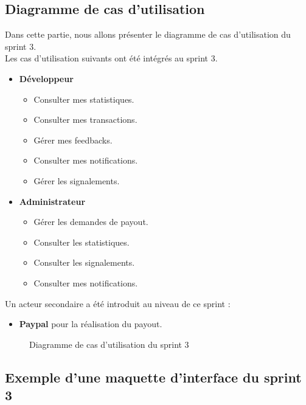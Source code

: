 \subsection{Diagramme de cas d'utilisation}
Dans cette partie, nous allons présenter le diagramme de cas d'utilisation du sprint 3. \\
Les cas d'utilisation suivants ont été intégrés au sprint 3.

\begin{itemize}
    \item  \textbf{Développeur}
    \begin{itemize}
        \item  Consulter mes statistiques.
        \item Consulter mes transactions.
        \item Gérer mes feedbacks.
        \item Consulter mes notifications.
        \item Gérer les signalements.
    \end{itemize}
    \item  \textbf{Administrateur}
    \begin{itemize}
        \item Gérer les demandes de payout.
        \item Consulter les statistiques.
        \item Consulter les signalements.
        \item Consulter mes notifications.
    \end{itemize} 
   
\end{itemize}
Un acteur secondaire a été introduit au niveau de ce sprint :
\begin{itemize}
\item \textbf{Paypal} pour la réalisation du payout.
\end{itemize} 
\pagebreak


\begin{figure}[H]
    \centering
    \caption{Diagramme de cas d'utilisation du sprint 3 }
    \label{fig:logo_tt}
\end{figure}

\pagebreak
\subsection{Exemple d'une maquette d'interface du sprint 3}

